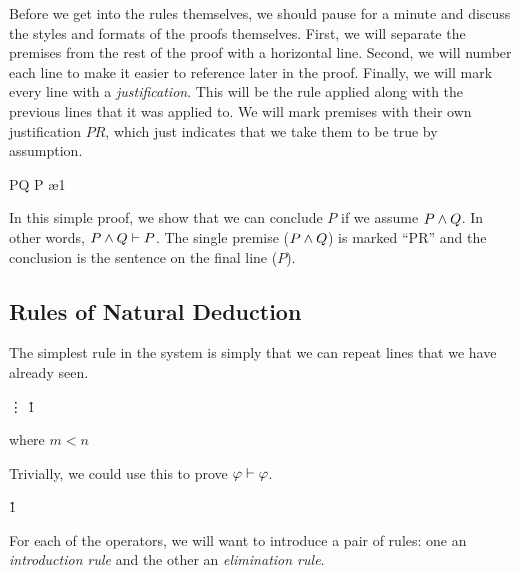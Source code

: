 Before we get into the rules themselves, we should pause for a minute and
discuss the styles and formats of the proofs themselves. First, we will
separate the premises from the rest of the proof with a horizontal line. Second,
we will number each line to make it easier to reference later in the proof. 
Finally, we will mark every line with a \emph{justification}. This will be the
rule applied along with the previous lines that it was applied to. We will mark
premises with their own justification $PR$, which just indicates that we take
them to be true by assumption.

\vspace{-0.5\baselineskip}
\begin{fitchproof}
 {P\eand Q} 
 {P}        \ae{1}
\end{fitchproof}

In this simple proof, we show that we can conclude $P$ if we assume $P\wedge Q$.
In other words, $P\wedge Q\vdash P$. The single premise ($P\wedge Q$) is marked
``PR'' and the conclusion is the sentence on the final line ($P$).

\subsection{Rules of Natural Deduction}

The simplest rule in the system is simply that we can repeat lines that we have
already seen.

\begin{fitchrule}[Repitition]
  \label{def:repitition-rule}
  \leavevmode
  \vspace{-0.9\baselineskip}
  \begin{fitchproof}
     \ephi
     {\vdots}    
     \ephi    \r{1}
  \end{fitchproof}
  \vspace{-0.9\baselineskip}
  where $m<n$
\end{fitchrule}

Trivially, we could use this to prove $\varphi\vdash\varphi$.

\begin{fitchproof}
   \ephi {}
   \ephi \r{1}
\end{fitchproof}

For each of the operators, we will want to introduce a pair of rules: one an
\emph{introduction rule} and the other an \emph{elimination rule}.

